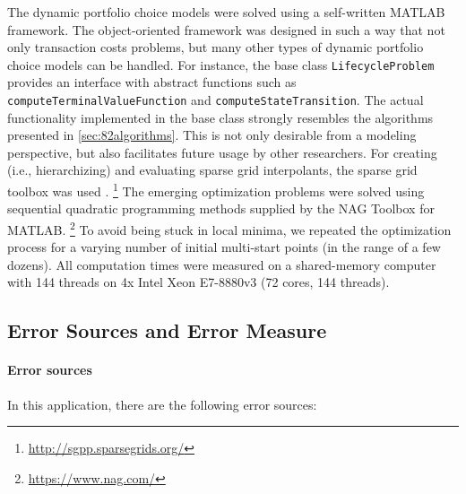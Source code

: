 The dynamic portfolio choice models were solved using a self-written
MATLAB framework.
The object-oriented framework was designed in such a way that
not only transaction costs problems,
but many other types of dynamic portfolio choice models can be handled.
For instance, the base class \texttt{LifecycleProblem} provides
an interface with abstract functions such as
\texttt{computeTerminalValueFunction} and
\texttt{computeStateTransition}.
The actual functionality implemented in the base class strongly resembles
the algorithms presented in \cref{sec:82algorithms}.
This is not only desirable from a modeling perspective,
but also facilitates future usage by other researchers.
For creating (i.e., hierarchizing) and evaluating sparse grid interpolants,
the sparse grid toolbox \sgpp was used \cite{Pflueger10Spatially}.%
\footnote{%
  \url{http://sgpp.sparsegrids.org/}%
}
The emerging optimization problems were solved using
sequential quadratic programming methods supplied by the
NAG Toolbox for MATLAB.%
\footnote{%
  \url{https://www.nag.com/}%
}
To avoid being stuck in local minima,
we repeated the optimization process for a varying number
of initial multi-start points (in the range of a few dozens).
All computation times were measured on a shared-memory computer
with 144 threads on 4x Intel Xeon E7-8880v3 (72 cores, 144 threads).



\subsection{Error Sources and Error Measure}
\label{sec:842errorSources}

\vspace*{0.25em}

\paragraph{Error sources}

In this application, there are the following error sources:

